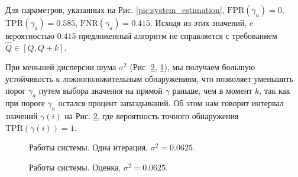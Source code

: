 \documentclass[specialist, substylefile = spbu.rtx,
			   subf, href, 12pt]{disser}
\begin{document}
Для параметров, указанных на Рис. \ref{pic:system_estimation}, $ \mathrm{FPR}(\gamma_a) = 0 $, $ \mathrm{TPR}(\gamma_a) = 0.585 $,  $ \mathrm{FNR}(\gamma_a) = 0.415 $. Исходя из этих значений, c вероятностью $ 0.415 $ предложенный алгоритм не справляется с требованием $ \hat{Q} \in [Q, Q+k] $.

При меньшей дисперсии шума $ \sigma^2 $ (Рис. \ref{pic:system_estimation_small_sd}, \ref{pic:system_estimation_small_sd_one_iter}), мы получаем большую устойчивость к ложноположительным обнаружениям, что позволяет уменьшить порог $ \gamma_a $ путем выбора значения на прямой $ \gamma $ раньше, чем в момент $ k $, так как при пороге $ \gamma_a $ остался процент запаздываний. Об этом нам говорит интервал значений $ \gamma(i) $ на Рис. \ref{pic:system_estimation_small_sd}, где вероятность точного обнаружения $ \mathrm{TPR}(\gamma(i)) = 1 $.


\begin{figure}[!hhh]
	\caption{Работы системы. Одна итерация, $ \sigma^2=0.0625 $.}
	\label{pic:system_estimation_small_sd_one_iter}
\end{figure}

\begin{figure}[!hhh]
	\caption{Работы системы. Оценка, $ \sigma^2=0.0625 $.}
	\label{pic:system_estimation_small_sd}
\end{figure}
\end{document}
